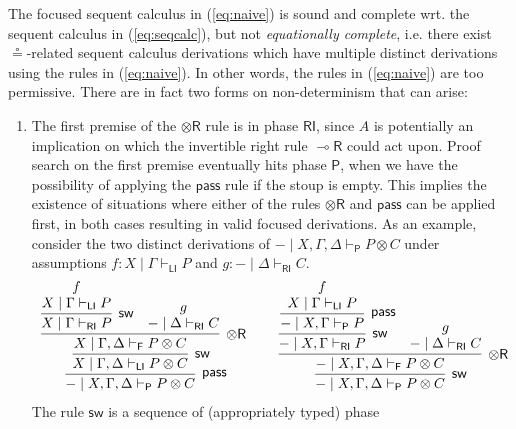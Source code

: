 \documentclass[submission,copyright,creativecommons]{eptcs}
\theoremstyle{definition}
\newcommand{\tr}{\otimes \mathsf{R}}
\newcommand{\lright}{{\multimap}\mathsf{R}}
\newcommand{\pass}{\mathsf{pass}}
\newcommand{\ot}{\otimes}
\newcommand{\RI}{\mathsf{RI}}
\newcommand{\LI}{\mathsf{LI}}
\newcommand{\Pass}{\mathsf{P}}
\newcommand{\F}{\mathsf{F}}
\newcommand{\proofbox}[1]{\begin{tabular}{l} #1 \end{tabular}}
\begin{document}
The focused sequent calculus in (\ref{eq:naive}) is sound and complete wrt. the sequent calculus in (\ref{eq:seqcalc}), but not \emph{equationally complete}, i.e. there exist $\circeq$-related sequent calculus derivations which have multiple distinct derivations using the rules in (\ref{eq:naive}). In other words, the rules in (\ref{eq:naive}) are too permissive. There are in fact two forms on non-determinism that can arise:
\begin{enumerate}
\item The first premise of the $\tr$ rule is in phase $\RI$, since $A$ is potentially an implication on which the invertible right rule $\lright$ could act upon. Proof search on the first premise eventually hits phase $\Pass$, when we have the possibility of applying the $\pass$ rule if the stoup is empty. This implies the existence of situations where either of the rules $\tr$ and $\pass$ can be applied first, in both cases resulting in valid focused derivations. 
  As an example, consider the two distinct derivations of $- \mid X , \Gamma , \Delta \vdash_{\Pass} P \ot C$ under assumptions $f : X \mid \Gamma \vdash_{\LI} P$ and $g : - \mid \Delta \vdash_{\RI} C$.
  \begin{equation}\label{eq:passtr}
    \proofbox{
      \infer[\pass]{- \mid X , \Gamma , \Delta \vdash_{\Pass} P \ot C}{
        \infer[\mathsf{sw}]{X \mid \Gamma , \Delta \vdash_{\LI} P \ot C}{
          \infer[\tr]{X \mid \Gamma , \Delta \vdash_{\F} P \ot C}{
            \infer[\mathsf{sw}]{X \mid \Gamma \vdash_{\RI} P}{
              \deduce{X \mid \Gamma \vdash_{\LI} P}{f}
            }
            &
            \deduce{- \mid \Delta \vdash_{\RI} C}{g}
          }
        }
      }
    \qquad
    \infer[\mathsf{sw}]{- \mid X , \Gamma , \Delta \vdash_{\Pass} P \ot C}{
      \infer[\tr]{- \mid X , \Gamma , \Delta \vdash_{\F} P \ot C}{
        \infer[\mathsf{sw}]{- \mid X , \Gamma \vdash_{\RI} P}{
          \infer[\pass]{- \mid X , \Gamma \vdash_{\Pass} P}{
            \deduce{X \mid \Gamma \vdash_{\LI} P}{f}
          }
        }
        &
        \deduce{- \mid \Delta \vdash_{\RI} C}{g}
      }
    }
    }
  \end{equation}
  The rule $\mathsf{sw}$ is a sequence of (appropriately typed) phase

\end{enumerate}
\end{document}
